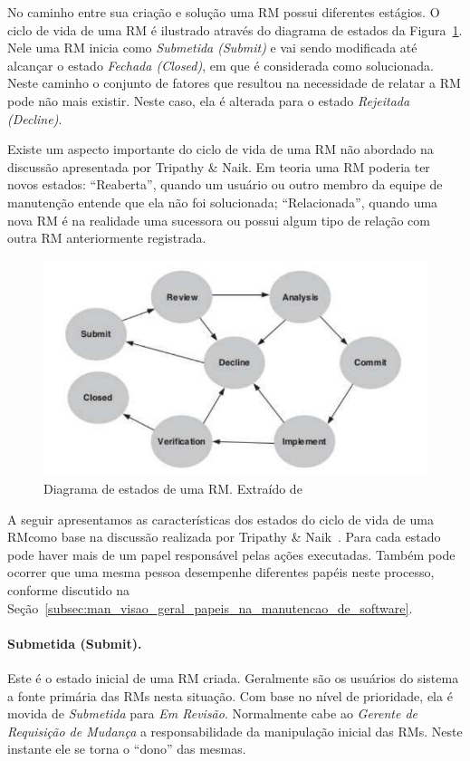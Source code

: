 No caminho entre sua criação e solução uma RM possui diferentes estágios. O
ciclo de vida de uma RM é ilustrado através do diagrama de estados da
Figura~\ref{fig:diagrama-estado-rm}. Nele uma RM inicia como \textit{Submetida
    (Submit)} e vai sendo modificada até alcançar o estado \textit{Fechada
    (Closed)}, em que é considerada como solucionada. Neste caminho o conjunto
de fatores que resultou na necessidade de relatar a RM pode não mais existir.
Neste caso, ela é alterada para o estado \textit{Rejeitada (Decline)}.

Existe um aspecto importante do ciclo de vida de uma RM não abordado na
discussão apresentada por Tripathy \& Naik. Em teoria uma RM poderia ter novos
estados: ``Reaberta'', quando um usuário ou outro membro da equipe de manutenção
entende que ela não foi solucionada; ``Relacionada'', quando uma nova RM é na
realidade uma sucessora ou possui algum tipo de relação com outra RM
anteriormente registrada.

\begin{figure}[htpb]
	\centering
	\includegraphics[width=0.5\linewidth]{./chapter-manutencao-software-visao-geral/img/diagrama-estado-rm.pdf}
	\caption{Diagrama de estados de uma RM\@. Extraído
		de~\cite{tripathy2014software}}
\label{fig:diagrama-estado-rm}
\end{figure}

A seguir apresentamos as características dos estados do ciclo de vida de uma
RM\@ como base na discussão realizada por Tripathy \&
Naik~\cite{tripathy2014software}. Para cada estado pode haver mais de um papel
responsável pelas ações executadas. Também pode ocorrer que uma mesma pessoa
desempenhe diferentes papéis neste processo, conforme discutido na
Seção~\ref{subsec:man_visao_geral_papeis_na_manutencao_de_software}.

\paragraph{Submetida (Submit).}
\label{par:submetida)}

Este é o estado inicial de uma RM criada. Geralmente são os usuários do sistema
a fonte primária das RMs nesta situação. Com base no nível de prioridade, ela é
movida de \textit{Submetida} para \textit{Em Revisão}. Normalmente cabe ao
\textit{Gerente de Requisição de Mudança} a responsabilidade da manipulação
inicial das RMs. Neste instante ele se torna o ``dono'' das mesmas.

